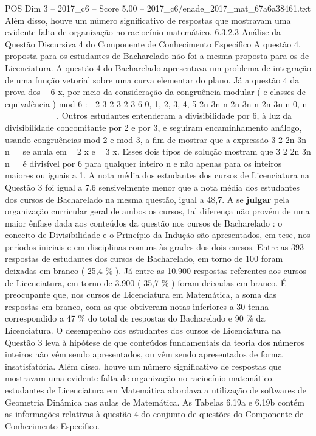 \begin{textsample}{POS Dim 3 – 2017\_c6 – Score 5.00 – 2017\_c6/enade\_2017\_mat\_67a6a38461.txt}
Além disso, houve um número significativo de respostas que mostravam uma evidente falta de organização no raciocínio matemático. 6.3.2.3 Análise da Questão Discursiva 4 do Componente de Conhecimento Específico A questão 4, proposta para os estudantes de Bacharelado não foi a mesma proposta para os de Licenciatura.
A questão 4 do Bacharelado apresentava um problema de integração de uma função vetorial sobre uma curva elementar do plano.
Já a questão 4 da prova dos  6 x, por meio da consideração da congruência modular ( e classes de equivalência ) mod 6 :  2 3 2 3 2 3 6 0, 1, 2, 3, 4, 5 2n 3n n 2n 3n n 2n 3n n 0, n          .
Outros estudantes entenderam a divisibilidade por 6, à luz da divisibilidade concomitante por 2 e por 3, e seguiram encaminhamento análogo, usando congruências mod 2 e mod 3, a fim de mostrar que a expressão 3 2 2n 3n n   se anula em  2 x e  3 x.
Esses dois tipos de solução mostram que 3 2 2n 3n n   é divisível por 6 para qualquer inteiro n e não apenas para os inteiros maiores ou iguais a 1.
A nota média dos estudantes dos cursos de Licenciatura na Questão 3 foi igual a 7,6 sensivelmente menor que a nota média dos estudantes dos cursos de Bacharelado na mesma questão, igual a 48,7.
A se \textbf{julgar} pela organização curricular geral de ambos os cursos, tal diferença não provém de uma maior ênfase dada aos conteúdos da questão nos cursos de Bacharelado : o conceito de Divisibilidade e o Princípio da Indução são apresentados, em tese, nos períodos iniciais e em disciplinas comuns às grades dos dois cursos.
Entre as 393 respostas de estudantes dos cursos de Bacharelado, em torno de 100 foram deixadas em branco ( 25,4 \% ).
Já entre as 10.900 respostas referentes aos cursos de Licenciatura, em torno de 3.900 ( 35,7 \% ) foram deixadas em branco.
É preocupante que, nos cursos de Licenciatura em Matemática, a soma das respostas em branco, com as que obtiveram notas inferiores a 30 tenha correspondido a 47 \% do total de respostas do Bacharelado e 90 \% da Licenciatura.
O desempenho dos estudantes dos cursos de Licenciatura na Questão 3 leva à hipótese de que conteúdos fundamentais da teoria dos números inteiros não vêm sendo apresentados, ou vêm sendo apresentados de forma insatisfatória.
Além disso, houve um número significativo de respostas que mostravam uma evidente falta de organização no raciocínio matemático. estudantes de Licenciatura em Matemática abordava a utilização de softwares de Geometria Dinâmica nas aulas de Matemática.
As Tabelas 6.19a e 6.19b contém as informações relativas à questão 4 do conjunto de questões do Componente de Conhecimento Específico.

\end{textsample}
